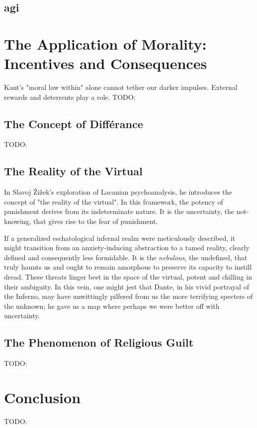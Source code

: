 \documentclass[12pt,a4]{article}
\begin{document}
    \subsection{\ac{agi}}

\section{The Application of Morality: Incentives and Consequences}
    
    Kant's "moral law within" alone cannot tether our darker impulses. External rewards and deterrents play a role.
    TODO:

    \subsection{The Concept of Différance}
    TODO:

    \subsection{The Reality of the Virtual}
         
        In Slavoj Žižek's exploration of Lacanian psychoanalysis, he introduces the concept of "the reality of the virtual".
        In this framework, the potency of punishment derives from its indeterminate nature. It is the uncertainty, the not-knowing, that gives rise to the fear of punishment. 
       
        \par
        If a generalized eschatological infernal realm were meticulously described, it might transition from an anxiety-inducing abstraction to a tamed reality, clearly defined and consequently less formidable. It is the \textit{nebulous}, the undefined, that truly haunts us and ought to remain amorphous to preserve its capacity to instill dread. These threats linger best in the space of the virtual, potent and chilling in their ambiguity. In this vein, one might jest that Dante, in his vivid portrayal of the Inferno, may have unwittingly pilfered from us the more terrifying specters of the unknown; he gave us a map where perhaps we were better off with uncertainty.
        

    \subsection{The Phenomenon of Religious Guilt}
        TODO:
        
\section{Conclusion}
    TODO:
\end{document}
